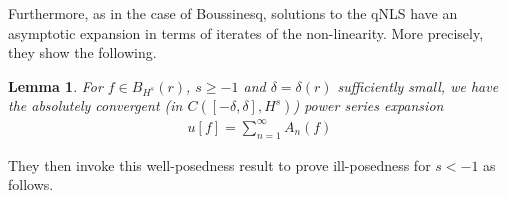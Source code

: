 \documentclass[12pt,reqno]{amsart}
\numberwithin{equation}{section}  %
\newtheorem{lemma}[theorem]{Lemma}
\begin{document}
%
%
Furthermore, as in the case of Boussinesq, solutions to the qNLS have an asymptotic
expansion in terms of iterates of the non-linearity. More precisely, they show
the following. 
%
\begin{lemma}
  \label{lem:qnls-asymp}
  For $f \in B_{H^{s}}(r)$, $s \ge -1$ and $\delta=\delta(r)$
sufficiently small, we have the absolutely convergent
(in $C([-\delta, \delta], H^{s})$) power series expansion
%
%
\begin{equation}
  \label{qnlspower-series-soln}
\begin{split}
  u[f] = \sum_{n=1}^{\infty} A_{n}(f)
\end{split}
\end{equation}
%
%
\end{lemma}
They then invoke this well-posedness result to prove ill-posedness for $s <
-1$ as follows.
%
%
%
%
\end{document}
